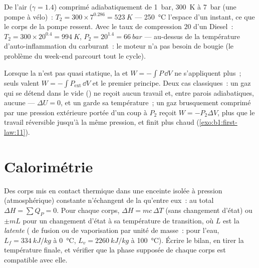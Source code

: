 \begin{example}\label{ex:b1:first-law:diesel}
De l'air ($\gamma = 1.4$) comprimé adiabatiquement de \qty{1}{bar},
\qty{300}{K} à \qty{7}{bar} (une pompe à vélo)~: $T_2 = 300 \times 7^{0.286} = \qty{523}{K}$
--- \qty{250}{\degreeCelsius} l'espace d'un instant, ce que le corps de la
pompe ressent. Avec le taux de compression $20$ d'un Diesel~: $T_2 = 300 \times 20^{0.4} = \qty{994}{K}$,
$P_2 = 20^{1.4} = \qty{66}{bar}$ --- au-dessus de la température
d'auto-inflammation du carburant~: le moteur n'a pas besoin de bougie (le
problème du week-end parcourt tout le cycle).
\end{example}

\begin{remark}\label{rem:b1:first-law:irreversible}
Lorsque la  n'est pas quasi statique, la  et $W =
-\int P\,\dd V$ ne s'appliquent plus~; seuls valent $W = -\int P_{\mathrm{ext}}\,\dd V$ et le
premier principe. Deux cas classiques~: un gaz qui se détend dans le vide
() ne reçoit aucun travail et, entre parois adiabatiques, aucune  --- $\Delta U
= 0$, et un  garde sa température~; un gaz brusquement comprimé
par une pression extérieure portée d'un coup à $P_2$ reçoit $W = -P_2\Delta V$, plus
que le travail réversible jusqu'à la même pression, et finit plus chaud
(\cref{exo:b1:first-law:11}).
\end{remark}

\section{Calorimétrie}

\begin{method}\label{met:b1:first-law:calorimetry}
Des corps mis en contact thermique dans une enceinte isolée à pression
(atmosphérique) constante n'échangent de la  qu'entre eux~: au total
$\Delta H = \sum Q_P = 0$. Pour chaque corps, $\Delta H = mc\,\Delta T$ (sans
changement d'état) ou $\pm mL$ pour un changement d'état à sa température de
transition, où $L$ est la \emph{ latente} ( de fusion ou de
vaporisation par unité de masse~: pour l'eau, $L_f = \qty{334}{kJ/kg}$ à \qty{0}{\degreeCelsius}, $L_v =
\qty{2260}{kJ/kg}$ à \qty{100}{\degreeCelsius}). Écrire le bilan, en tirer la
température finale, et vérifier que la phase supposée de chaque corps est
compatible avec elle.
\end{method}


